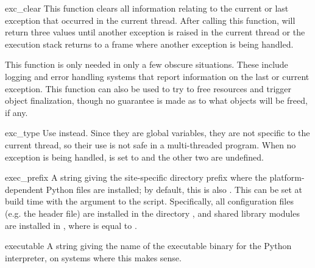 \begin{funcdesc}{exc_clear}{}
  This function clears all information relating to the current or last
  exception that occurred in the current thread.  After calling this
  function,  will return three  values until
  another exception is raised in the current thread or the execution stack
  returns to a frame where another exception is being handled.
  
  This function is only needed in only a few obscure situations.  These
  include logging and error handling systems that report information on the
  last or current exception.  This function can also be used to try to free
  resources and trigger object finalization, though no guarantee is made as
  to what objects will be freed, if any.
\end{funcdesc}

\begin{datadesc}{exc_type}
            {Use  instead.}
  Since they are global variables, they are not specific to the
  current thread, so their use is not safe in a multi-threaded
  program.  When no exception is being handled,  is set
  to  and the other two are undefined.
\end{datadesc}

\begin{datadesc}{exec_prefix}
  A string giving the site-specific directory prefix where the
  platform-dependent Python files are installed; by default, this is
  also .  This can be set at build time with the
   argument to the 
  script.  Specifically, all configuration files (e.g. the
   header file) are installed in the directory
  , and shared
  library modules are installed in , where  is
  equal to .
\end{datadesc}

\begin{datadesc}{executable}
  A string giving the name of the executable binary for the Python
  interpreter, on systems where this makes sense.
\end{datadesc}

